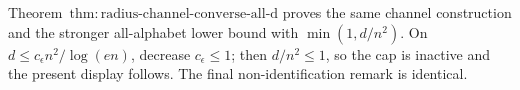 Theorem~\(\mathrm{thm:radius\text{-}channel\text{-}converse\text{-}all\text{-}d}\) proves the same channel construction and the stronger all-alphabet lower bound with \(\min(1,d/n^2)\).  On \(d\le c_{\epsilon}n^2/\log(en)\), decrease \(c_{\epsilon}\le1\); then \(d/n^2\le1\), so the cap is inactive and the present display follows.  The final non-identification remark is identical.